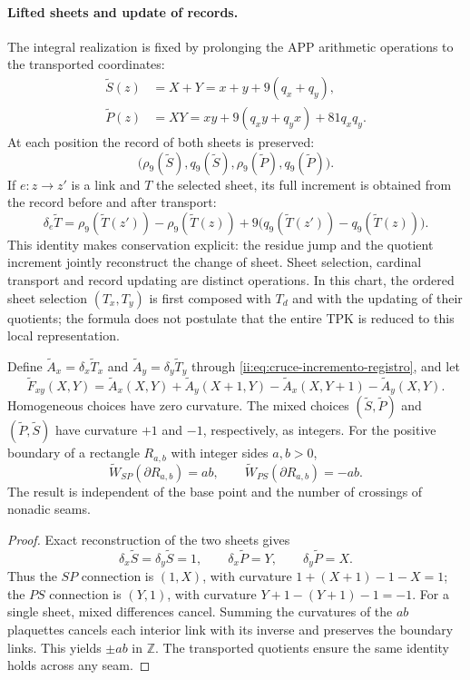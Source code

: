 \paragraph{Lifted sheets and update of records.}
The integral realization is fixed by prolonging the APP arithmetic
operations to the transported coordinates:
\begin{align*}
 \widetilde S(z)&=X+Y=x+y+9(q_x+q_y),\\
 \widetilde P(z)&=XY
 =xy+9(q_xy+q_yx)+81q_xq_y.
\end{align*}
At each position the record of both sheets is preserved:
\[
 \bigl(\rho_9(\widetilde S),q_9(\widetilde S),
       \rho_9(\widetilde P),q_9(\widetilde P)\bigr).
\]
If $e:z\to z'$ is a link and $T$ the selected sheet, its full increment
is obtained from the record before and after transport:
\begin{equation}
 \delta_e\widetilde T=
 \rho_9(\widetilde T(z'))-\rho_9(\widetilde T(z))
 +9\bigl(q_9(\widetilde T(z'))-q_9(\widetilde T(z))\bigr).
 \label{ii:eq:cruce-incremento-registro}
\end{equation}
This identity makes conservation explicit: the residue jump and the quotient increment jointly reconstruct the change of sheet. Sheet selection, cardinal transport and record updating are distinct operations. In this chart, the ordered sheet selection $(T_x,T_y)$ is first composed with $T_d$ and with the updating of their quotients; the formula does not postulate that the entire TPK is reduced to this local representation.

\begin{proposition}
\label{ii:prop:cruce-stokes-integral}
Define
$\widetilde A_x=\delta_x\widetilde T_x$ and
$\widetilde A_y=\delta_y\widetilde T_y$ through
\eqref{ii:eq:cruce-incremento-registro}, and let
\[
 \widetilde F_{xy}(X,Y)=
 \widetilde A_x(X,Y)+\widetilde A_y(X+1,Y)
 -\widetilde A_x(X,Y+1)-\widetilde A_y(X,Y).
\]
Homogeneous choices have zero curvature. The mixed choices
$(\widetilde S,\widetilde P)$ and
$(\widetilde P,\widetilde S)$ have curvature
$+1$ and $-1$, respectively, as integers. For the positive boundary of a rectangle
$R_{a,b}$ with integer sides $a,b>0$,
\[
 \widetilde W_{SP}(\partial R_{a,b})=ab,\qquad
 \widetilde W_{PS}(\partial R_{a,b})=-ab.
\]
The result is independent of the base point and the number of crossings
of nonadic seams.
\end{proposition}

\begin{proof}
Exact reconstruction of the two sheets gives
\[
 \delta_x\widetilde S=\delta_y\widetilde S=1,
 \qquad\delta_x\widetilde P=Y,
 \qquad\delta_y\widetilde P=X.
\]
Thus the $SP$ connection is $(1,X)$, with curvature
$1+(X+1)-1-X=1$; the $PS$ connection is $(Y,1)$, with curvature
$Y+1-(Y+1)-1=-1$. For a single sheet, mixed
differences cancel. Summing the curvatures of the $ab$ plaquettes cancels each
interior link with its inverse and preserves the boundary links.
This yields $\pm ab$ in $\mathbb Z$. The transported quotients
ensure the same identity holds across any seam.
\end{proof}

